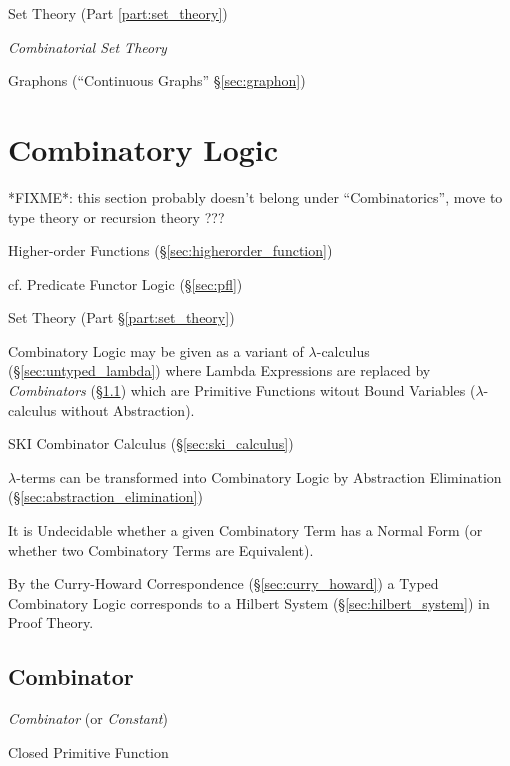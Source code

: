 Set Theory (Part \ref{part:set_theory})

\emph{Combinatorial Set Theory}

Graphons (``Continuous Graphs'' \S\ref{sec:graphon})



\section{Combinatory Logic}\label{sec:combinatory_logic}

*FIXME*: this section probably doesn't belong under ``Combinatorics'', move to
type theory or recursion theory ???

Higher-order Functions (\S\ref{sec:higherorder_function})

\fist cf. Predicate Functor Logic (\S\ref{sec:pfl})

Set Theory (Part \S\ref{part:set_theory})

Combinatory Logic may be given as a variant of $\lambda$-calculus
(\S\ref{sec:untyped_lambda}) where Lambda Expressions are replaced by
\emph{Combinators} (\S\ref{sec:combinator}) which are Primitive
Functions witout Bound Variables ($\lambda$-calculus without
Abstraction).

SKI Combinator Calculus (\S\ref{sec:ski_calculus})

$\lambda$-terms can be transformed into Combinatory Logic by
Abstraction Elimination (\S\ref{sec:abstraction_elimination})

It is Undecidable whether a given Combinatory Term has a Normal Form
(or whether two Combinatory Terms are Equivalent).

By the Curry-Howard Correspondence (\S\ref{sec:curry_howard}) a Typed
Combinatory Logic corresponds to a Hilbert System
(\S\ref{sec:hilbert_system}) in Proof Theory.



\subsection{Combinator}\label{sec:combinator}

\emph{Combinator} (or \emph{Constant})

Closed Primitive Function


